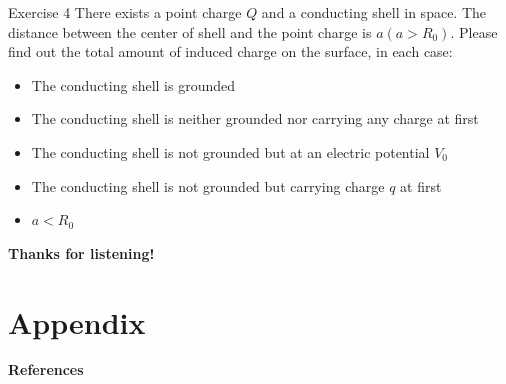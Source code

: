 \documentclass{beamer}
\begin{document}
\begin{frame}{Exercise 4}
    There exists a point charge $Q$ and a conducting shell in space. The distance between the center of shell 
    and the point charge is $a(a>R_0)$. Please find out the total amount of induced charge on the surface, in each case:
    \begin{itemize}
        \item The conducting shell is grounded
        \item The conducting shell is neither grounded nor carrying any charge at first
        \item The conducting shell is not grounded but at an electric potential $V_0$
        \item The conducting shell is not grounded but carrying charge $q$ at first
        \item $a<R_0$
    \end{itemize}
\end{frame}


\begin{frame}
    \begin{center}
        \LARGE\bf Thanks for listening!
    \end{center}
	
\end{frame}


\section{Appendix}


\begin{frame}{\bf References}
	\nocite{*} %
	
	
\end{frame}
\end{document}

